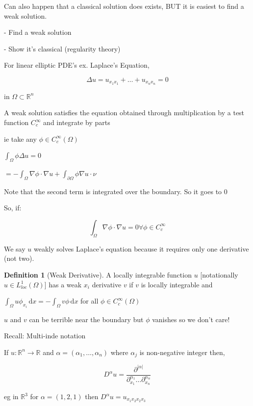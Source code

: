 \documentclass{article}
\theoremstyle{definition}
\newtheorem{definition}{Definition}
\begin{document}
Can also happen that a classical solution does exists, BUT it is easiest to find a weak solution.

- Find a weak solution

- Show it's classical (regularity theory)

For linear elliptic PDE's ex. Laplace's Equation,

\[
    \Delta u = u_{x_1 x_1} + \dots + u_{x_n x_n} = 0
\]

in \(\Omega \subset \mathbb{R} ^n\) 

A weak solution satisfies the equation obtained through multiplication by a test function \(C^{\infty} _c\) and integrate by parts

ie take any \(\phi\in C^{\infty} _c(\Omega )\) 

\(\int_{\Omega }^{} \phi \Delta u = 0\) 

\(= - \int_{\Omega }^{} \nabla \phi \cdot \nabla u + \int_{\partial \Omega }^{} \phi \nabla u \cdot \nu \) 

Note that the second term is integrated over the boundary. So it goes to \(0\)

So, if:

\[
    \int_{\Omega }^{} \nabla \phi \cdot \nabla u = 0 \forall \phi\in C_c^{\infty}
\]

We say \(u\) weakly solves Laplace's equation because it requires only one derivative (not two).

\begin{definition}
    [Weak Derivative]

    A locally integrable function \(u\) [notationally \(u\in L^1_{loc} (\Omega)\)] has a weak \(x_i\) derivative \(v\) if \(v\) is locally integrable and 

    \(\int_\Omega u \phi_{x_i} \, \mathrm{d} x = - \int_\Omega v \phi \,\mathrm{d} x \) for all \(\phi\in C_c^{\infty} (\Omega)\)  
\end{definition}

\(u\) and \(v\) can be terrible near the boundary but \(\phi\) vanishes so we don't care!

Recall: Multi-inde notation

If \(u:\mathbb{R} ^n \to \mathbb{R} \) and \(\alpha = (\alpha _1, \dots , \alpha _n)\) where \(\alpha _j\) is non-negative integer then,

\[
    D^\alpha u = \frac{\partial ^{\vert \alpha  \vert }}{\partial ^{\alpha _1}_{x_1}\dots \partial ^{\alpha _n}_{x_n}}
\]

eg in \(\mathbb{R} ^3\) for \(\alpha =(1,2,1)\) then \(D^\alpha u = u_{x_1 x_2 x_2 x_3}\) 
\end{document}
